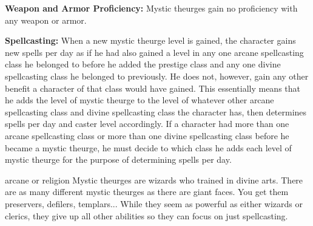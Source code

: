 {
\textbf{Weapon and Armor Proficiency:} Mystic theurges gain no proficiency with any weapon or armor.

\textbf{Spellcasting:} When a new mystic theurge level is gained, the character gains new spells per day as if he had also gained a level in any one arcane spellcasting class he belonged to before he added the prestige class and any one divine spellcasting class he belonged to previously. He does not, however, gain any other benefit a character of that class would have gained. This essentially means that he adds the level of mystic theurge to the level of whatever other arcane spellcasting class and divine spellcasting class the character has, then determines spells per day and caster level accordingly. If a character had more than one arcane spellcasting class or more than one divine spellcasting class before he became a mystic theurge, he must decide to which class he adds each level of mystic theurge for the purpose of determining spells per day.
}
{}
{arcane or religion}
{Mystic theurges are wizards who trained in divine arts.}
{There are as many different mystic theurges as there are giant faces. You get them preservers, defilers, templars...}
{While they seem as powerful as either wizards or clerics, they give up all other abilities so they can focus on just spellcasting.}
